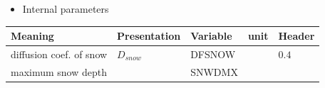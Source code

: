 \begin{itemize}
\tightlist
\item
  Internal parameters
\end{itemize}

\setlength\LTleft{0pt}\setlength\LTright{0pt}\begin{longtable}[]{@{}lllll@{}}
\toprule\relax
\begin{minipage}[b]{0.19\columnwidth}\raggedright
Meaning\strut
\end{minipage} & \begin{minipage}[b]{0.15\columnwidth}\raggedright
Presentation\strut
\end{minipage} & \begin{minipage}[b]{0.11\columnwidth}\raggedright
Variable\strut
\end{minipage} & \begin{minipage}[b]{0.04\columnwidth}\raggedright
unit\strut
\end{minipage} & \begin{minipage}[b]{0.37\columnwidth}\raggedright
Header\strut
\end{minipage}\tabularnewline
\midrule\relax
\endhead
\begin{minipage}[t]{0.19\columnwidth}\raggedright
diffusion coef. of snow\strut
\end{minipage} & \begin{minipage}[t]{0.15\columnwidth}\raggedright
\(D_{snow}\)\strut
\end{minipage} & \begin{minipage}[t]{0.11\columnwidth}\raggedright
DFSNOW\strut
\end{minipage} & \begin{minipage}[t]{0.04\columnwidth}\raggedright
\strut
\end{minipage} & \begin{minipage}[t]{0.37\columnwidth}\raggedright
\(0.4\)\strut
\end{minipage}\tabularnewline
\begin{minipage}[t]{0.19\columnwidth}\raggedright
maximum snow depth\strut
\end{minipage} & \begin{minipage}[t]{0.15\columnwidth}\raggedright
\strut
\end{minipage} & \begin{minipage}[t]{0.11\columnwidth}\raggedright
SNWDMX\strut
\end{minipage} & \begin{minipage}[t]{0.04\columnwidth}\raggedright

\end{minipage}
\end{longtable}
